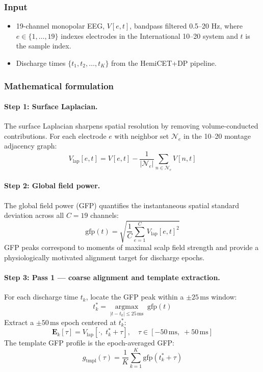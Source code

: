 \subsubsection{Input}

\begin{itemize}
  \item 19-channel monopolar EEG, $V[e,t]$, bandpass filtered 0.5--20 Hz, where $e \in \{1,\ldots,19\}$ indexes electrodes in the International 10--20 system and $t$ is the sample index.
  \item Discharge times $\{t_1, t_2, \ldots, t_K\}$ from the HemiCET+DP pipeline.
\end{itemize}

\subsubsection{Mathematical formulation}

\paragraph{Step 1: Surface Laplacian.}
The surface Laplacian sharpens spatial resolution by removing volume-conducted contributions. For each electrode $e$ with neighbor set $\mathcal{N}_e$ in the 10--20 montage adjacency graph:
\[ V_{\mathrm{lap}}[e,t] = V[e,t] - \frac{1}{|\mathcal{N}_e|} \sum_{n \in \mathcal{N}_e} V[n,t] \tag{1} \]

\paragraph{Step 2: Global field power.}
The global field power (GFP) quantifies the instantaneous spatial standard deviation across all $C = 19$ channels:
\[ \mathrm{gfp}(t) = \sqrt{\frac{1}{C} \sum_{e=1}^{C} V_{\mathrm{lap}}[e,t]^2} \tag{2} \]
GFP peaks correspond to moments of maximal scalp field strength and provide a physiologically motivated alignment target for discharge epochs.

\paragraph{Step 3: Pass 1 --- coarse alignment and template extraction.}
For each discharge time $t_k$, locate the GFP peak within a $\pm 25\,\mathrm{ms}$ window:
\[ t_k^* = \underset{|t - t_k| \leq 25\,\mathrm{ms}}{\operatorname{argmax}}\; \mathrm{gfp}(t) \tag{3} \]
Extract a $\pm 50\,\mathrm{ms}$ epoch centered at $t_k^*$:
\[ \mathbf{E}_k[\tau] = V_{\mathrm{lap}}[\cdot,\; t_k^* + \tau], \quad \tau \in [-50\,\mathrm{ms},\; +50\,\mathrm{ms}] \tag{4} \]
The template GFP profile is the epoch-averaged GFP:
\[ g_{\mathrm{tmpl}}(\tau) = \frac{1}{K} \sum_{k=1}^{K} \mathrm{gfp}(t_k^* + \tau) \tag{5} \]

